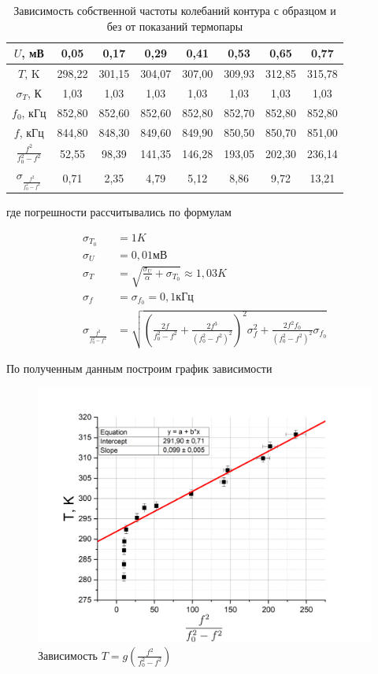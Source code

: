 \documentclass[a4paper,12pt]{article}
\begin{document}
\begin{table}[h!]
\centering
\caption{Зависимость собственной частоты колебаний контура с образцом и без от показаний термопары}
\begin{tabular}{|c|c|c|c|c|c|c|c|}
\hline
$U$, мВ & 0,05 & 0,17 & 0,29 & 0,41 & 0,53 & 0,65 & 0,77 \\ \hline
$T$, K & 298,22 & 301,15 & 304,07 & 307,00 & 309,93 & 312,85 & 315,78 \\ \hline
$\sigma_T$, К & 1,03 & 1,03 & 1,03 & 1,03 & 1,03 & 1,03 & 1,03 \\ \hline
$f_0$, кГц & 852,80 & 852,60 & 852,60 & 852,80 & 852,70 & 852,80 & 852,80 \\ \hline
$f$, кГц & 844,80 & 848,30 & 849,60 & 849,90 & 850,50 & 850,70 & 851,00 \\ \hline
$\frac{f^2}{f_0^2 - f^2}$ & 52,55 & 98,39 & 141,35 & 146,28 & 193,05 & 202,30 & 236,14 \\ \hline
$\sigma_{\frac{f^2}{f_0^2 - f^2}}$ & 0,71 & 2,35 & 4,79 & 5,12 & 8,86 & 9,72 & 13,21 \\ \hline
\end{tabular}
\end{table}

где погрешности рассчитывались по формулам

\begin{align*}
	\sigma_{T_0} &= 1 K \\
	\sigma_U &= 0,01 мВ \\ 
	\sigma_T &= \sqrt{\frac{\sigma_U}{\alpha} + \sigma_{T_0}} \approx 1,03 K \\
	\sigma_f &= \sigma_{f_0} = 0,1 кГц \\
	\sigma_{\frac{f^2}{f_0^2 - f^2}} &= \sqrt{ \left( \frac{2f}{f_0^2 - f^2} + \frac{2 f^3}{(f_0^2 - f^2)^2} \right)^2 \sigma_f^2 + \frac{2 f^2 f_0}{(f_0^2 - f^2)^2} \sigma_{f_0}}
\end{align*}

\newpage

По полученным данным построим график зависимости 

\begin{figure}[h!]
	\centering
	\includegraphics[width = \linewidth]{graph_1}
	\caption{Зависимость $T = g(\frac{f^2}{f_0^2 - f^2})$}
\end{figure}
\end{document}
